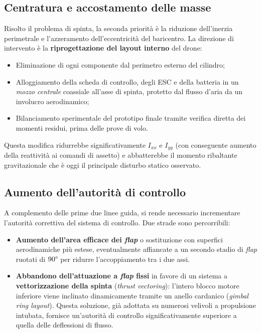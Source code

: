 \documentclass[11pt]{report}
\begin{document}
	\subsection{Centratura e accostamento delle masse}
	\label{sec:centratura_masse}
	Risolto il problema di spinta, la seconda priorità è la riduzione dell'inerzia perimetrale e l'azzeramento dell'eccentricità del baricentro. La direzione di intervento è la \textbf{riprogettazione del layout interno} del drone:
	\begin{itemize}
		\item Eliminazione di ogni componente dal perimetro esterno del cilindro;
		\item Alloggiamento della scheda di controllo, degli ESC e della batteria in un \textit{mozzo centrale} coassiale all'asse di spinta, protetto dal flusso d'aria da un involucro aerodinamico;
		\item Bilanciamento sperimentale del prototipo finale tramite verifica diretta dei momenti residui, prima delle prove di volo.
	\end{itemize}
	Questa modifica ridurrebbe significativamente $I_{xx}$ e $I_{yy}$ (con conseguente aumento della reattività ai comandi di assetto) e abbatterebbe il momento ribaltante gravitazionale che è oggi il principale disturbo statico osservato.
	
	\subsection{Aumento dell'autorità di controllo}
	\label{sec:aumento_autorita}
	A complemento delle prime due linee guida, si rende necessario incrementare l'autorità correttiva del sistema di controllo. Due strade sono percorribili:
	\begin{itemize}
		\item \textbf{Aumento dell'area efficace dei \textit{flap}} o sostituzione con superfici aerodinamiche più estese, eventualmente affiancate a un secondo stadio di \textit{flap} ruotati di $90\degree$ per ridurre l'accoppiamento tra i due assi.
		\item \textbf{Abbandono dell'attuazione a \textit{flap} fissi} in favore di un sistema a \textbf{vettorizzazione della spinta} (\textit{thrust vectoring}): l'intero blocco motore inferiore viene inclinato dinamicamente tramite un anello cardanico (\textit{gimbal ring layout}). Questa soluzione, già adottata su numerosi velivoli a propulsione intubata, fornisce un'autorità di controllo significativamente superiore a quella delle deflessioni di flusso.
	\end{itemize}
	
\end{document}

